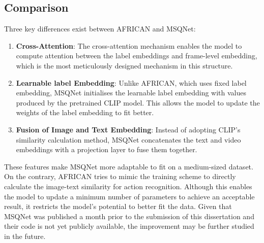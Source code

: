 \subsection{Comparison}
Three key differences exist between AFRICAN and MSQNet: 

\begin{enumerate}
    \item \textbf{Cross-Attention}: The cross-attention mechanism enables the model to compute attention between the label embeddings and frame-level embedding, which is the most meticulously designed mechanism in this structure.
    \item \textbf{Learnable label Embedding}: Unlike AFRICAN, which uses fixed label embedding, MSQNet initialises the learnable label embedding with values produced by the pretrained CLIP model. This allows the model to update the weights of the label embedding to fit better.
    \item \textbf{Fusion of Image and Text Embedding}: Instead of adopting CLIP's similarity calculation method, MSQNet concatenates the text and video embeddings with a projection layer to fuse them together. 
\end{enumerate}

These features make MSQNet more adaptable to fit on a medium-sized dataset. On the contrary, AFRICAN tries to mimic the training scheme to directly calculate the image-text similarity for action recognition. Although this enables the model to update a minimum number of parameters to achieve an acceptable result, it restricts the model's potential to better fit the data. Given that MSQNet was published a month prior to the submission of this dissertation and their code is not yet publicly available, the improvement may be further studied in the future.



